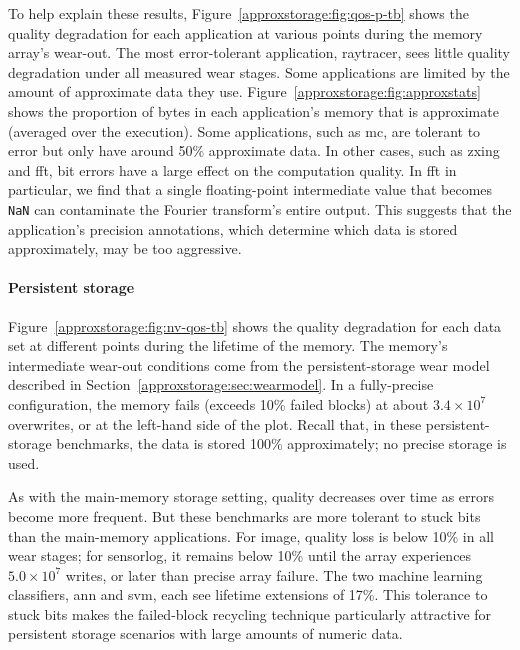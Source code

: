 To help explain these results, Figure~\ref{approxstorage:fig:qos-p-tb} shows the quality
degradation for each application at various points during the memory array's
wear-out.
The most error-tolerant application, \textsf{raytracer}, sees
little quality degradation under all measured wear stages.
Some applications are limited by the amount of approximate data they use.
Figure~\ref{approxstorage:fig:approxstats} shows the proportion of bytes in each
application's memory that is approximate (averaged over the execution).
Some applications,
such as \textsf{mc}, are tolerant to error but only have around 50\%
approximate data. In other
cases, such as \textsf{zxing} and \textsf{fft}, bit errors
have a large effect on the computation quality. In \textsf{fft} in
particular, we find that a single floating-point intermediate value that
becomes \verb+NaN+ can contaminate the Fourier transform's entire output.
This suggests that the application's precision
annotations, which determine which data is stored approximately, may be
too aggressive.

\paragraph{Persistent storage}

Figure~\ref{approxstorage:fig:nv-qos-tb} shows the quality degradation for each data set at
different points during the lifetime of the memory.
The memory's intermediate
wear-out conditions come from the persistent-storage wear model described in
Section~\ref{approxstorage:sec:wearmodel}.
In a fully-precise configuration, the memory fails (exceeds 10\% failed blocks)
at about $3.4 \times 10^{7}$ overwrites, or at the left-hand side of the plot.
Recall that, in these persistent-storage benchmarks, the data is stored 100\%
approximately; no precise storage is used.

As with the main-memory storage setting, quality decreases over time as errors
become more frequent. But these benchmarks are more tolerant to stuck bits
than the main-memory applications. For \textsf{image}, quality loss is below
10\% in all wear stages; for \textsf{sensorlog}, it remains below 10\% until
the array experiences
$5.0 \times 10^{7}$ writes, or  later than precise array failure.
The two machine learning classifiers, \textsf{ann} and \textsf{svm},
each see lifetime extensions of 17\%.
This tolerance to
stuck bits makes the failed-block recycling technique particularly attractive
for persistent storage scenarios with large amounts of numeric data.

